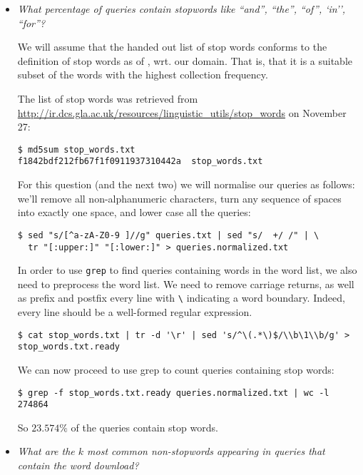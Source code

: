 \begin{itemize}
\item \emph{What percentage of queries contain stopwords like ``and'', ``the'',
``of'', `in'', ``for''?}

We will assume that the handed out list of stop words conforms to the
definition of stop words as of \cite[\textsection\ 2.2.2 (p. 27)]{irbook}, wrt.
our domain. That is, that it is a suitable subset of the words with the highest
collection frequency.

The list of stop words was retrieved from
\url{http://ir.dcs.gla.ac.uk/resources/linguistic_utils/stop_words} on November
27:

\begin{lstlisting}
$ md5sum stop_words.txt
f1842bdf212fb67f1f0911937310442a  stop_words.txt
\end{lstlisting}

For this question (and the next two) we will normalise our queries as follows:
we'll remove all non-alphanumeric characters, turn any sequence of spaces into
exactly one space, and lower case all the queries:

\begin{lstlisting}
$ sed "s/[^a-zA-Z0-9 ]//g" queries.txt | sed "s/  +/ /" | \
  tr "[:upper:]" "[:lower:]" > queries.normalized.txt
\end{lstlisting}

In order to use \texttt{grep} to find queries containing words in the word
list, we also need to preprocess the word list. We need to remove carriage
returns, as well as prefix and postfix every line with \texttt{\textbackslash}
indicating a word boundary. Indeed, every line should be a well-formed regular
expression.

\begin{lstlisting}
$ cat stop_words.txt | tr -d '\r' | sed 's/^\(.*\)$/\\b\1\\b/g' > stop_words.txt.ready
\end{lstlisting}

We can now proceed to use grep to count queries containing stop words:

\begin{lstlisting}
$ grep -f stop_words.txt.ready queries.normalized.txt | wc -l
274864
\end{lstlisting}

So $23.574\%$ of the queries contain stop words.

\item \emph{What are the $k$ most common non-stopwords appearing in queries
that contain the word download?}


\end{itemize}
